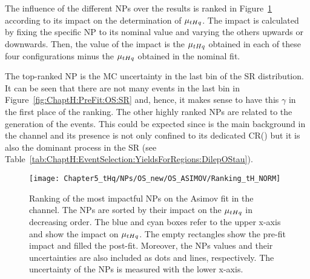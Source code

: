 The influence of the different NPs over the results is ranked in Figure~\ref{fig:ChaptH:Asimov:OS:Ranking} according to its  impact on the determination of $\mu_{tHq}$.  
 The impact is calculated by fixing the specific NP to its nominal value and varying the others upwards or downwards. Then, the value of the impact is the $\mu_{tHq}$  obtained in each of these four configurations minus the $\mu_{tHq}$ obtained in the nominal fit.   
 
 The top-ranked NP is the MC uncertainty in the last bin of the SR distribution. 
 It can be seen that there are not many events in the last bin in Figure~\ref{fig:ChaptH:PreFit:OS:SR} 
 and, hence, it makes sense to have this $\gamma$ in the first place of the ranking.
 The other highly ranked NPs are related to the generation of the \ttbar events.
 This could be expected since \ttbar is the main background in the \dilepOStau
 channel and its presence is not only confined to its dedicated CR(\ttbar) but it
 is also the dominant process in the SR (see Table~\ref{tab:ChaptH:EventSelection:YieldsForRegions:DilepOStau}).
  

\begin{figure}[h]%
    \centering
        \texttt{[image: Chapter5\_tHq/NPs/OS\_new/OS\_ASIMOV/Ranking\_tH\_NORM]}
    \caption{Ranking of the most impactful NPs on the Asimov fit in the \dilepOStau channel. 
    The NPs are sorted by their impact on the $\mu_{tHq}$ in decreasing order. 
    The blue and cyan boxes refer to the upper x-axis and show the impact on $\mu_{tHq}$.
    The empty rectangles show the pre-fit impact and filled the post-fit. 
    Moreover, the NPs values and their uncertainties are also included as dots and 
    lines, respectively. The uncertainty of the NPs is measured with the lower x-axis.}
    \label{fig:ChaptH:Asimov:OS:Ranking}
\end{figure}


